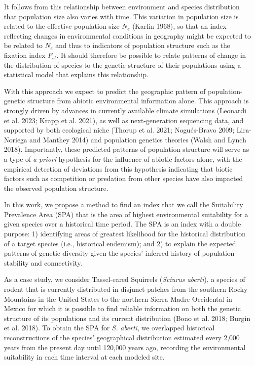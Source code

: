 \documentclass[
]{article}
\begin{document}
It follows from this relationship between environment and species
distribution that population size also varies with time. This variation
in population size is related to the effective population size \(N_e\)
(Karlin 1968), so that an index reflecting changes in environmental
conditions in geography might be expected to be related to \(N_e\) and
thus to indicators of population structure such as the fixation index
\(F_{st}\). It should therefore be possible to relate patterns of change
in the distribution of species to the genetic structure of their
populations using a statistical model that explains this relationship.

With this approach we expect to predict the geographic pattern of
population-genetic structure from abiotic environmental information
alone. This approach is strongly driven by advances in currently
available climate simulations (Leonardi et al. 2023; Krapp et al. 2021),
as well as next-generation sequencing data, and supported by both
ecological niche (Thorup et al. 2021; Nogués-Bravo 2009; Lira-Noriega
and Manthey 2014) and population genetics theories (Walsh and Lynch
2018). Importantly, these predicted patterns of population structure
will serve as a type of \textit{a priori} hypothesis for the influence
of abiotic factors alone, with the empirical detection of deviations
from this hypothesis indicating that biotic factors such as competition
or predation from other species have also impacted the observed
population structure.

In this work, we propose a method to find an index that we call the
Suitability Prevalence Area (SPA) that is the area of highest
environmental suitability for a given species over a historical time
period. The SPA is an index with a double purpose: 1) identifying areas
of greatest likelihood for the historical distribution of a target
species (i.e., historical endemism); and 2) to explain the expected
patterns of genetic diversity given the species' inferred history of
population stability and connectivity.

As a case study, we consider Tassel-eared Squirrels
(\textit{Sciurus aberti}), a species of rodent that is currently
distributed in disjunct patches from the southern Rocky Mountains in the
United States to the northern Sierra Madre Occidental in Mexico for
which it is possible to find reliable information on both the genetic
structure of its populations and its current distribution (Bono et al.
2018; Burgin et al. 2018). To obtain the SPA for \textit{S. aberti}, we
overlapped historical reconstructions of the species' geographical
distribution estimated every 2,000 years from the present day until
120,000 years ago, recording the environmental suitability in each time
interval at each modeled site.
\end{document}
